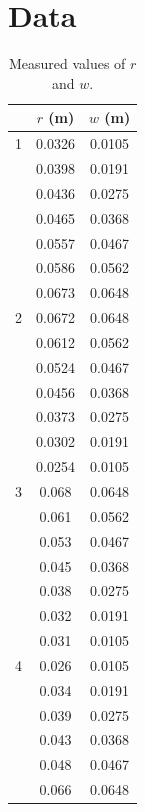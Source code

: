 \documentclass[12pt]{article}
\begin{document}
    \section{Data}
        \begin{table}[H]
            \centering
            \begin{tabular}{c|c|c}
                &\(r\) (m)& \(w\) (m)\\
                \hline
                1&0.0326&	0.0105\\
                &0.0398&	0.0191\\
                &0.0436&	0.0275\\
                &0.0465&	0.0368\\
                &0.0557&	0.0467\\
                &0.0586&	0.0562\\
                &0.0673&	0.0648\\
                \hline
                2&0.0672&	0.0648\\
                &0.0612&	0.0562\\
                &0.0524&	0.0467\\
                &0.0456&	0.0368\\
                &0.0373&	0.0275\\
                &0.0302&	0.0191\\
                &0.0254&	0.0105\\
                \hline
                3&0.068&	0.0648\\
                &0.061&	0.0562\\
                &0.053&	0.0467\\
                &0.045&	0.0368\\
                &0.038&	0.0275\\
                &0.032&	0.0191\\
                &0.031&	0.0105\\
                \hline
                4&0.026&	0.0105\\
                &0.034&	0.0191\\
                &0.039&	0.0275\\
                &0.043&	0.0368\\
                &0.048&	0.0467\\
                &0.066&	0.0648\\
            \end{tabular}\\
            \caption{Measured values of \(r\) and \(w\).}
        \end{table}
\end{document}
